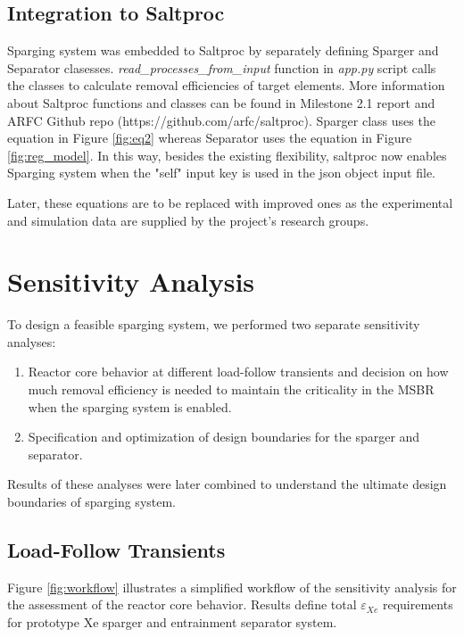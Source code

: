\newpage
\FloatBarrier

\subsection{Integration to Saltproc}

    Sparging system was embedded to Saltproc by separately defining Sparger and Separator clasesses. \textit{read\_processes\_from\_input} function in \textit{app.py} script calls the classes to calculate removal efficiencies of target elements. More information about Saltproc functions and classes can be found in Milestone 2.1 report \cite{rykhlevskii_milestone_2019} and ARFC Github repo (https://github.com/arfc/saltproc). Sparger class uses the equation in Figure \ref{fig:eq2} whereas Separator uses the equation in Figure \ref{fig:reg_model}. In this way, besides the existing flexibility, saltproc now enables Sparging system when the "self" input key is used in the json object input file.

    Later, these equations are to be replaced with improved ones as the experimental and simulation data are supplied by the project's research groups.

\newpage
\FloatBarrier

\section{Sensitivity Analysis}

    To design a feasible sparging system, we performed two separate sensitivity analyses:

    \begin{enumerate}
        \item Reactor core behavior at different load-follow transients and decision on how much removal efficiency is needed to maintain the criticality in the MSBR when the sparging system is enabled.
        \item Specification and optimization of design boundaries for the sparger and separator.
    \end{enumerate}

    Results of these analyses were later combined to understand the ultimate design boundaries of sparging system.

\subsection{Load-Follow Transients}

    Figure \ref{fig:workflow} illustrates a simplified workflow of the sensitivity analysis for the assessment of the reactor core behavior. Results define total $\varepsilon$$_{Xe}$ requirements for prototype Xe sparger and entrainment separator system.

